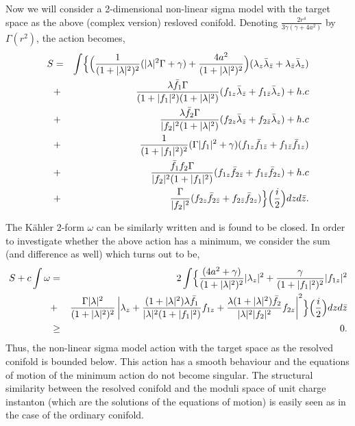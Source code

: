 \documentclass[a4paper,12pt]{article}
\begin{document}
\vspace{0.5cm}

Now we will consider a 2-dimensional non-linear sigma model with the target 
space as the above (complex version) resloved conifold. Denoting
$\frac{2r^4}{3\gamma(\gamma + 4a^2)}$ by $\Gamma (r^2)$, the action becomes,
\begin{eqnarray}
S&=& \int \Bigl\{ \Big( \frac{1}{(1+| \lambda |^2)^2}(| \lambda |^2\Gamma 
+\gamma) + \frac{4a^2}{(1+| \lambda |^2)^2}\Bigr) ({\lambda}_z
{\bar{\lambda}}_{\bar{z}}+{\lambda}_{\bar{z}}{\bar{\lambda}}_z) 
\nonumber \\
&+&\frac{\lambda {\bar{f}}_1\Gamma}{(1+|f_1|^2)(1+|\lambda |^2)}(f_{1z}
{\bar{\lambda}}_{\bar{z}}+f_{1\bar{z}}{\bar{\lambda}}_z) + h.c 
\nonumber \\
&+& \frac{\lambda {\bar{f}}_2\Gamma}{|f_2|^2(1+|\lambda |^2)}(f_{2z}
{\bar{\lambda}}_{\bar{z}}+{f}_{2\bar{z}}{\bar{\lambda}}_z) + h.c 
\nonumber \\
&+&\frac{1}{(1+|f_1|^2)^2}(\Gamma |f_1|^2 + \gamma)(f_{1z}{\bar{f}}_{1
\bar{z}}+f_{1\bar{z}}{\bar{f}}_{1z}) \nonumber \\
&+&\frac{{\bar{f}}_1f_2\Gamma}{|f_2|^2(1+|f_1|^2)}(f_{1z}{\bar{f}}_
{2\bar{z}}+f_{1\bar{z}}{\bar{f}}_{2z}) + h.c 
\nonumber \\
&+& \frac{\Gamma}{|f_2|^2}(f_{2z}{\bar{f}}_{2\bar{z}}+f_{2\bar{z}}
{\bar{f}}_{2z}) \Bigr\} \Bigl( \frac{i}{2} \Bigr) dz d\bar{z}.
\end{eqnarray}

\vspace{0.5cm}

The K\"{a}hler 2-form $\omega$ can be similarly written and is found to be 
closed. In order to investigate whether the above action has a minimum, we
consider the sum (and difference as well) which turns out to be,
\begin{eqnarray}
S+c\int \omega &=& 2\int \Bigl\{ \frac{(4a^2+\gamma)}{(1+|\lambda |^2)^2}
|{\lambda}_z|^2 + \frac{\gamma}{(1+|f_1|^2)^2} |f_{1z}|^2 \nonumber \\
&+& \frac{\Gamma |\lambda |^2}{(1+|\lambda |^2)^2} \left | {\lambda}_z + 
\frac{(1+|\lambda|^2)\lambda {\bar{f}}_1}{|\lambda|^2(1+|f_1|^2)}f_{1z}
+\frac{\lambda (1+|\lambda |^2){\bar{f}}_2}{|\lambda |^2|f_2|^2}f_{2z}
\right |^2 \Bigr\} \Big( \frac{i}{2}\Big) dz d\bar{z} \nonumber \\
&\geq & 0.
\end{eqnarray}
Thus, the non-linear sigma model action with the target space as the resolved 
conifold is bounded below.  
This action has a smooth behaviour and the equations of motion of the 
minimum action do not become singular. The structural 
similarity between the 
resolved conifold and the moduli space of unit charge instanton (which are 
the solutions of the equations of motion) is easily seen as in the case of the
ordinary conifold.   
\end{document}
